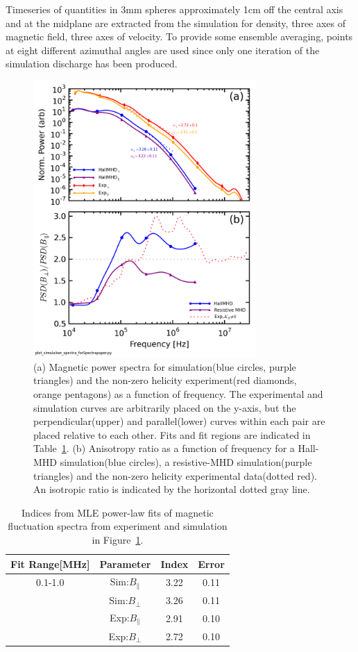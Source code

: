 \documentclass[aip,prl,amsmath,amssymb,reprint,superscriptaddress]{revtex4-1} %
\begin{document}
Timeseries of quantities in 3mm spheres approximately 1cm off the central axis and at the midplane are extracted from the simulation for density, three axes of magnetic field, three axes of velocity. To provide some ensemble averaging, points at eight different azimuthal angles are used since only one iteration of the simulation discharge has been produced.

\begin{figure}[!htbp]
\centerline{
\includegraphics[width=8.5cm]{Anisotropy_simulation_comparison}}
\caption{\label{fig:aniso_comp} (a) Magnetic power spectra for simulation(blue circles, purple triangles) and the non-zero helicity experiment(red diamonds, orange pentagons) as a function of frequency. The experimental and simulation curves are arbitrarily placed on the y-axis, but the perpendicular(upper) and parallel(lower) curves within each pair are placed relative to each other. Fits and fit regions are indicated in Table~\ref{tab:Simindices}. (b) Anisotropy ratio as a function of frequency for a Hall-MHD simulation(blue circles), a resistive-MHD simulation(purple triangles) and the non-zero helicity experimental data(dotted red). An isotropic ratio is indicated by the horizontal dotted gray line.}
\end{figure}

\begin{table}
\caption{\label{tab:Simindices}Indices from MLE power-law fits of magnetic fluctuation spectra from experiment and simulation in Figure~\ref{fig:aniso_comp}.}
\begin{tabular}{cccc}
\toprule
Fit Range[MHz]	&	Parameter						&	Index	&Error\\
\hline
0.1-1.0					& Sim:$B_{\parallel}$	& 3.22	&0.11\\
								& Sim:$B_{\perp}$			& 3.26  &0.11\\
								& Exp:$B_{\parallel}$	& 2.91	&0.10\\
								& Exp:$B_{\perp}$			& 2.72  &0.10\\
\hline
\end{tabular}
\end{table}
\end{document}
